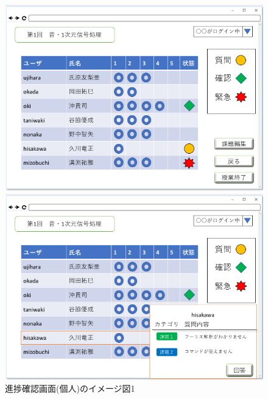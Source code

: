 \begin{figure}[htbp]
 \begin{minipage}{0.5\hsize}
  \begin{center}
   \includegraphics[width=1\linewidth,clip]{./img/22.png}
  \end{center}

 \end{minipage}
 \begin{minipage}{0.5\hsize}
  \begin{center}
   \includegraphics[width=1\linewidth,clip]{./img/23.png}
  \end{center}
 \end{minipage}
 \caption{進捗確認画面(個人)のイメージ図1}\label{fig:22}
\end{figure}

